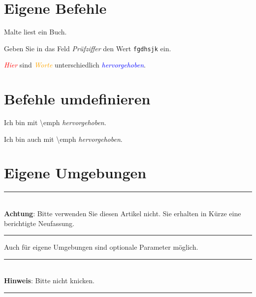 \documentclass{scrartcl}
\newcommand{\mycommand}[2]{#1 liest #2.}
\newcommand{\gui}[1]{\textsl{\textsf{#1}}}
\newcommand{\user}[1]{\texttt{#1}}
\newcommand{\wichtig}[2][red]{\textcolor{#1}{\emph{#2}}}
\newenvironment{achtung}[1][Achtung]{%
  \rule{\textwidth}{1pt}\\%
  \textbf{#1}: %
}{%
  \\\rule[1ex]{\textwidth}{1pt}%
}
\begin{document}
  \section{Eigene Befehle}
  \mycommand{Malte}{ein Buch}

  Geben Sie in das Feld \gui{Prüfziffer}
  den Wert \user{fgdhsjk} ein.

  \wichtig{Hier} sind \wichtig[orange]{Worte}
  unterschiedlich \wichtig[blue]{hervorgehoben}.

  \section{Befehle umdefinieren}

  Ich bin mit \textbackslash emph \emph{hervorgehoben}.

  \renewcommand{\emph}[1]{\textsl{#1}}

  Ich bin auch mit \textbackslash emph \emph{hervorgehoben}.

  \section{Eigene Umgebungen}

  \begin{achtung}%
    Bitte verwenden Sie diesen Artikel nicht.
    Sie erhalten in Kürze eine berichtigte Neufassung.
  \end{achtung}

  Auch für eigene Umgebungen sind optionale Parameter möglich.

  \begin{achtung}[Hinweis]%
    Bitte nicht knicken.
  \end{achtung}
\end{document}
